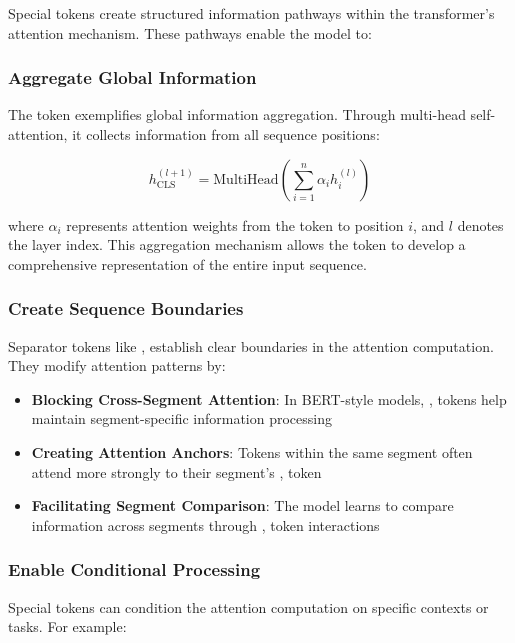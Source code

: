 Special tokens create structured information pathways within the transformer's attention mechanism. These pathways enable the model to:

\subsubsection{Aggregate Global Information}

The \cls{} token exemplifies global information aggregation. Through multi-head self-attention, it collects information from all sequence positions:

\begin{equation}
h_{\text{CLS}}^{(l+1)} = \text{MultiHead}\left(\sum_{i=1}^{n} \alpha_{i} h_i^{(l)}\right)
\end{equation}

where $\alpha_i$ represents attention weights from the \cls{} token to position $i$, and $l$ denotes the layer index. This aggregation mechanism allows the \cls{} token to develop a comprehensive representation of the entire input sequence.

\subsubsection{Create Sequence Boundaries}

Separator tokens like \sep{} establish clear boundaries in the attention computation. They modify attention patterns by:

\begin{itemize}
\item \textbf{Blocking Cross-Segment Attention}: In BERT-style models, \sep{} tokens help maintain segment-specific information processing
\item \textbf{Creating Attention Anchors}: Tokens within the same segment often attend more strongly to their segment's \sep{} token
\item \textbf{Facilitating Segment Comparison}: The model learns to compare information across segments through \sep{} token interactions
\end{itemize}

\subsubsection{Enable Conditional Processing}

Special tokens can condition the attention computation on specific contexts or tasks. For example:

